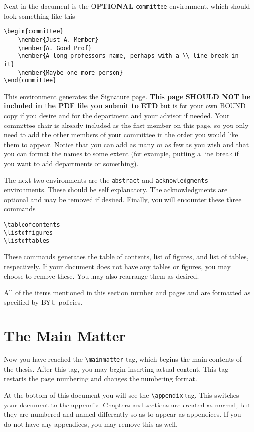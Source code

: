 \documentclass[12pt]{thesis}
\begin{document}
Next in the document is the \textbf{OPTIONAL} \texttt{committee} environment, which should look something like this
\begin{verbatim}
\begin{committee}
	\member{Just A. Member}
	\member{A. Good Prof}
	\member{A long professors name, perhaps with a \\ line break in it}
	\member{Maybe one more person}
\end{committee}	
\end{verbatim}
This environment generates the Signature page.  \textbf{This page SHOULD NOT be included in the PDF file you submit to ETD} but is for your own BOUND copy if you desire and for the department and your advisor if needed. Your committee chair is already included as the first member on this page, so you only need to add the other members of your committee in the order you would like them to appear. Notice that you can add as many or as few as you wish and that you can format the names to some extent (for example, putting a line break if you want to add departments or something).

The next two environments are the \texttt{abstract} and \texttt{acknowledgments} environments. These should be self explanatory. The acknowledgments are optional and may be removed if desired. Finally, you will encounter these three commands
\begin{verbatim}
\tableofcontents
\listoffigures
\listoftables
\end{verbatim}
These commands generates the table of contents, list of figures, and list of tables, respectively. If your document does not have any tables or figures, you may choose to remove these. You may also rearrange them as desired.

All of the items mentioned in this section number and pages and are formatted as specified by BYU policies.

\section{The Main Matter}
Now you have reached the \verb=\mainmatter= tag, which begins the main contents of the thesis. After this tag, you may begin inserting actual content. This tag restarts the page numbering and changes the numbering format.

At the bottom of this document you will see the \verb=\appendix= tag. This switches your document to the appendix. Chapters and sections are created as normal, but they are numbered and named differently so as to appear as appendices. If you do not have any appendices, you may remove this as well.
\end{document}

